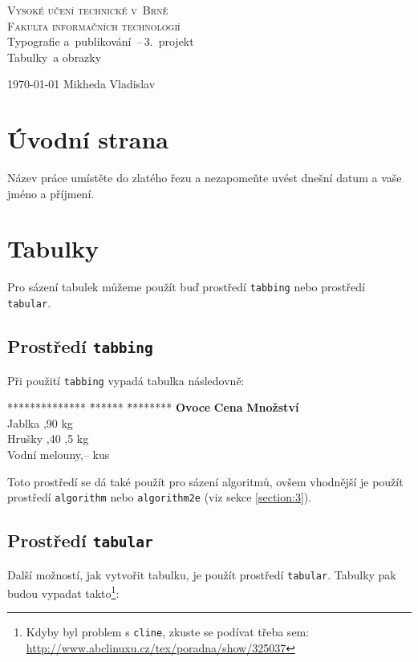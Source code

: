 \documentclass[a4paper,11pt]{article}
\begin{document}
\begin{titlepage}
    \begin{center}
        \Huge
        \textsc{Vysoké učení technické v~Brně\\
               \huge Fakulta informačních technologií}\\
               
        \LARGE
                Typografie a~publikování \,--\,3.~projekt\\
                \Huge Tabulky~a obrazky\\
    \end{center}
    {\Large \today \hfill
                Mikheda Vladislav}
\end{titlepage}

\section{Úvodní strana}
Název práce umístěte do zlatého řezu a nezapomeňte uvést dnešní datum a vaše jméno a příjmení.

\section{Tabulky}
Pro sázení tabulek můžeme použít buď prostředí \texttt{tabbing} nebo prostředí \texttt{tabular}.

\subsection{Prostředí \texttt{tabbing}}
Při použití \texttt{tabbing} vypadá tabulka následovně:

\begin{tabbing}
************** \= ****** \= ********\kill
{\bf Ovoce} \> {\bf Cena} \>  {\bf Množství}\\
Jablka ,90  kg\\
Hrušky ,40 ,5 kg\\
Vodní melouny,–  kus
\end{tabbing}\bigskip
Toto prostředí se dá také použít pro sázení algoritmů, ovšem vhodnější je použít prostředí \texttt{algorithm} nebo \texttt{algorithm2e} (viz sekce \ref{section:3}).

\subsection{Prostředí \texttt{tabular}}
Další možností, jak vytvořit tabulku, je použít prostředí \texttt{tabular}. Tabulky pak 
budou vypadat takto\footnote{Kdyby byl problem s \texttt{cline}, zkuste se podívat třeba sem: \href{http://www.abclinuxu.cz/tex/poradna/show/325037}{http://www.abclinuxu.cz/tex/poradna/show/325037}}:\medskip
\end{document}
